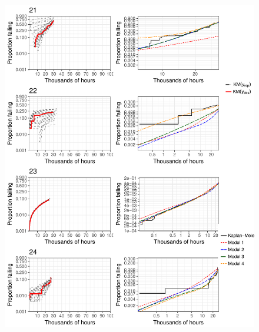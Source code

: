 \documentclass[12pt]{article}
\begin{document}
\begin{figure}[H]
\includegraphics[width=\textwidth]{ppcheck-v2-6.pdf}
\end{figure}
\end{document}
